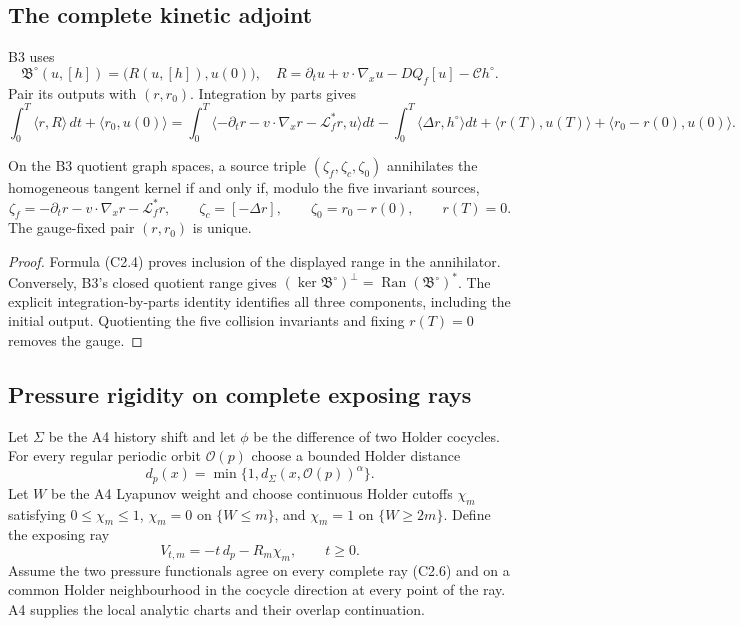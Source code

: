 \subsection{The complete kinetic adjoint}

B3 uses
\[
 \mathfrak B^\circ(u,[h])
 =\bigl(R(u,[h]),u(0)\bigr),
 \quad
 R=\partial_tu+v\cdot\nabla_xu-DQ_f[u]-\mathcal Ch^\circ.               \tag{C2.3}
\]
Pair its outputs with $(r,r_0)$.  Integration by parts gives
\[
 \int_0^T\langle r,R\rangle\,dt+\langle r_0,u(0)\rangle
 =
 \int_0^T\langle-\partial_tr-v\cdot\nabla_xr-\mathcal L_f^*r,u\rangle dt
 -\int_0^T\langle\Delta r,h^\circ\rangle dt
 +\langle r(T),u(T)\rangle+\langle r_0-r(0),u(0)\rangle.                 \tag{C2.4}
\]

\begin{theorem}
\label{thm:r27-c2-annihilator}
On the B3 quotient graph spaces, a source triple
$(\zeta_f,\zeta_c,\zeta_0)$ annihilates the homogeneous tangent kernel if and
only if, modulo the five invariant sources,
\[
 \zeta_f=-\partial_tr-v\cdot\nabla_xr-\mathcal L_f^*r,\qquad
 \zeta_c=[-\Delta r],\qquad
 \zeta_0=r_0-r(0),\qquad r(T)=0.                          \tag{C2.5}
\]
The gauge-fixed pair $(r,r_0)$ is unique.
\end{theorem}

\begin{proof}
Formula (C2.4) proves inclusion of the displayed range in the annihilator.
Conversely, B3's closed quotient range gives
$(\ker\mathfrak B^\circ)^\perp=\operatorname{Ran}
(\mathfrak B^\circ)^*$.  The explicit integration-by-parts identity identifies
all three components, including the initial output.  Quotienting the five
collision invariants and fixing $r(T)=0$ removes the gauge.
\end{proof}

\subsection{Pressure rigidity on complete exposing rays}

Let $\Sigma$ be the A4 history shift and let $\phi$ be the difference of two
Holder cocycles.  For every regular periodic orbit $\mathcal O(p)$ choose a
bounded Holder distance
\[
 d_p(x)=\min\{1,d_\Sigma(x,\mathcal O(p))^\alpha\}.
\]
Let $W$ be the A4 Lyapunov weight and choose continuous Holder cutoffs
$\chi_m$ satisfying $0\le\chi_m\le1$, $\chi_m=0$ on $\{W\le m\}$, and
$\chi_m=1$ on $\{W\ge2m\}$.  Define the exposing ray
\[
 V_{t,m}=-t\,d_p-R_m\chi_m,\qquad t\ge0.                  \tag{C2.6}
\]
Assume the two pressure functionals agree on every complete ray (C2.6) and
on a common Holder neighbourhood in the cocycle direction at every point of
the ray.  A4 supplies the local analytic charts and their overlap
continuation.

